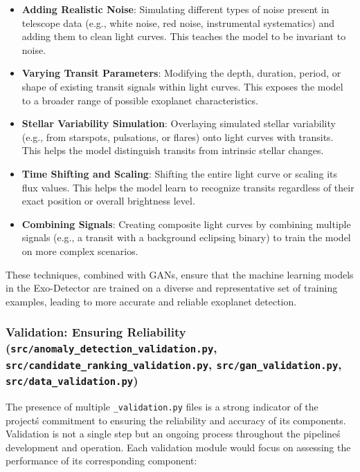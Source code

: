 \documentclass{article}
\begin{document}
\begin{itemize}
    \item \textbf{Adding Realistic Noise}: Simulating different types of noise present in telescope data (e.g., white noise, red noise, instrumental systematics) and adding them to clean light curves. This teaches the model to be invariant to noise.
    \item \textbf{Varying Transit Parameters}: Modifying the depth, duration, period, or shape of existing transit signals within light curves. This exposes the model to a broader range of possible exoplanet characteristics.
    \item \textbf{Stellar Variability Simulation}: Overlaying simulated stellar variability (e.g., from starspots, pulsations, or flares) onto light curves with transits. This helps the model distinguish transits from intrinsic stellar changes.
    \item \textbf{Time Shifting and Scaling}: Shifting the entire light curve or scaling its flux values. This helps the model learn to recognize transits regardless of their exact position or overall brightness level.
    \item \textbf{Combining Signals}: Creating composite light curves by combining multiple signals (e.g., a transit with a background eclipsing binary) to train the model on more complex scenarios.
\end{itemize}

These techniques, combined with GANs, ensure that the machine learning models in the Exo-Detector are trained on a diverse and representative set of training examples, leading to more accurate and reliable exoplanet detection.

\subsubsection{Validation: Ensuring Reliability (\texttt{src/anomaly\_detection\_validation.py}, \texttt{src/candidate\_ranking\_validation.py}, \texttt{src/gan\_validation.py}, \texttt{src/data\_validation.py})}

The presence of multiple \texttt{\_validation.py} files is a strong indicator of the project\'s commitment to ensuring the reliability and accuracy of its components. Validation is not a single step but an ongoing process throughout the pipeline\'s development and operation. Each validation module would focus on assessing the performance of its corresponding component:
\end{document}
